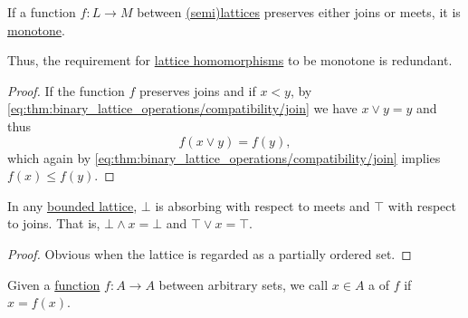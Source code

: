 \begin{corollary}\label{thm:lattice_homomorphism_is_monotone}
  If a function \( f: L \to M \) between \hyperref[def:semilattice]{(semi)lattices} preserves either joins or meets, it is \hyperref[def:partially_ordered_set/homomorphism]{monotone}.

  Thus, the requirement for \hyperref[def:semilattice/homomorphism]{lattice homomorphisms} to be monotone is redundant.
\end{corollary}
\begin{proof}
  If the function \( f \) preserves joins and if \( x < y \), by \eqref{eq:thm:binary_lattice_operations/compatibility/join} we have \( x \vee y = y \) and thus
  \begin{equation*}
    f(x \vee y) = f(y),
  \end{equation*}
  which again by \eqref{eq:thm:binary_lattice_operations/compatibility/join} implies \( f(x) \leq f(y) \).
\end{proof}

\begin{proposition}\label{thm:bounded_lattice_absorbing}
  In any \hyperref[def:semilattice/bounded]{bounded lattice}, \( \bot \) is absorbing with respect to meets and \( \top \) with respect to joins. That is, \( \bot \wedge x = \bot \) and \( \top \vee x = \top \).
\end{proposition}
\begin{proof}
  Obvious when the lattice is regarded as a partially ordered set.
\end{proof}

\begin{definition}\label{def:fixed_point}
  Given a \hyperref[def:function]{function} \( f: A \to A \) between arbitrary sets, we call \( x \in A \) a  of \( f \) if \( x = f(x) \).
\end{definition}

